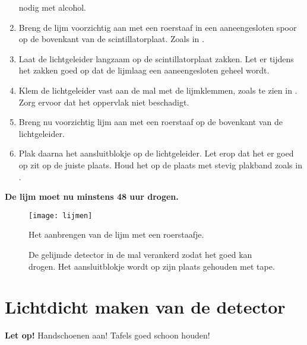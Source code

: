 \begin{enumerate}
    nodig met alcohol.
    \item Breng de lijm voorzichtig aan met een roerstaaf in een
    aaneengesloten spoor op de bovenkant van de scintillatorplaat. Zoals
    in .
    \item Laat de lichtgeleider langzaam op de scintillatorplaat zakken.
    Let er tijdens het zakken goed op dat de lijmlaag een aaneengesloten
    geheel wordt.
    \item Klem de lichtgeleider vast aan de mal met de lijmklemmen,
    zoals te zien in . Zorg ervoor dat het oppervlak
    niet beschadigt.
    \item Breng nu voorzichtig lijm aan met een roerstaaf op de
    bovenkant van de lichtgeleider.
    \item Plak daarna het aansluitblokje op de lichtgeleider. Let erop
    dat het er goed op zit op de juiste plaats. Houd het op de plaats
    met stevig plakband zoals in .
\end{enumerate}

\textbf{De lijm moet nu minstens 48 uur drogen.}

\begin{figure}
    \centering
    \texttt{[image: lijmen]}
    \caption{Het aanbrengen van de lijm met een roerstaafje.}
    \label{fig:lijmen}
\end{figure}

\begin{figure}
    \centering
    \caption{De gelijmde detector in de mal verankerd zodat het goed kan
             drogen. Het aansluitblokje wordt op zijn plaats gehouden
             met tape.}
\end{figure}


\section{Lichtdicht maken van de detector}

\textbf{Let op!} Handschoenen aan! Tafels goed schoon houden!

